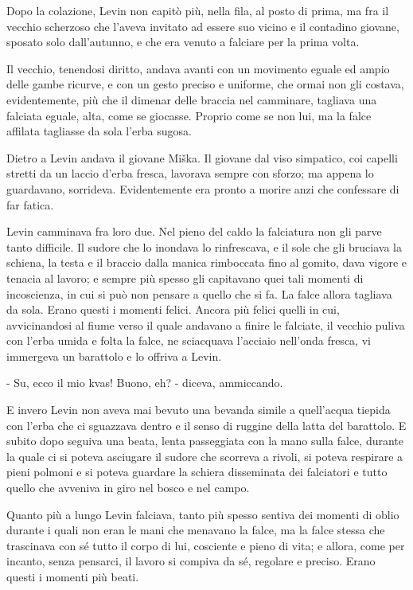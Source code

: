 \label{v-2} 

Dopo la colazione, Levin non capitò più, nella fila, al posto di prima, ma fra il vecchio scherzoso che l'aveva invitato ad essere suo vicino e il contadino giovane, sposato solo dall'autunno, e che era venuto a falciare per la prima volta. 

Il vecchio, tenendosi diritto, andava avanti con un movimento eguale ed ampio delle gambe ricurve, e con un gesto preciso e uniforme, che ormai non gli costava, evidentemente, più che il dimenar delle braccia nel camminare, tagliava una falciata eguale, alta, come se giocasse. Proprio come se non lui, ma la falce affilata tagliasse da sola l'erba sugosa. 

Dietro a Levin andava il giovane Miška. Il giovane dal viso simpatico, coi capelli stretti da un laccio d'erba fresca, lavorava sempre con sforzo; ma appena lo guardavano, sorrideva. Evidentemente era pronto a morire anzi che confessare di far fatica. 

Levin camminava fra loro due. Nel pieno del caldo la falciatura non gli parve tanto difficile. Il sudore che lo inondava lo rinfrescava, e il sole che gli bruciava la schiena, la testa e il braccio dalla manica rimboccata fino al gomito, dava vigore e tenacia al lavoro; e sempre più spesso gli capitavano quei tali momenti di incoscienza, in cui si può non pensare a quello che si fa. La falce allora tagliava da sola. Erano questi i momenti felici. Ancora più felici quelli in cui, avvicinandosi al fiume verso il quale andavano a finire le falciate, il vecchio puliva con l'erba umida e folta la falce, ne sciacquava l'acciaio nell'onda fresca, vi immergeva un barattolo e lo offriva a Levin. 

- Su, ecco il mio kvas! Buono, eh? - diceva, ammiccando. 

E invero Levin non aveva mai bevuto una bevanda simile a quell'acqua tiepida con l'erba che ci sguazzava dentro e il senso di ruggine della latta del barattolo. E subito dopo seguiva una beata, lenta passeggiata con la mano sulla falce, durante la quale ci si poteva asciugare il sudore che scorreva a rivoli, si poteva respirare a pieni polmoni e si poteva guardare la schiera disseminata dei falciatori e tutto quello che avveniva in giro nel bosco e nel campo. 

Quanto più a lungo Levin falciava, tanto più spesso sentiva dei momenti di oblio durante i quali non eran le mani che menavano la falce, ma la falce stessa che trascinava con sé tutto il corpo di lui, cosciente e pieno di vita; e allora, come per incanto, senza pensarci, il lavoro si compiva da sé, regolare e preciso. Erano questi i momenti più beati. 


